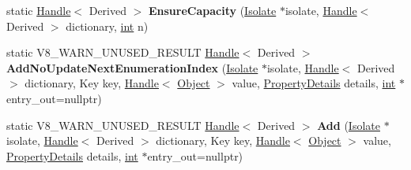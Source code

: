 \begin{DoxyCompactItemize}
\item 
\mbox{\label{classv8_1_1internal_1_1BaseNameDictionary_aee93748509f1c90c4a878e96349450c7}} 
static \mbox{\hyperlink{classv8_1_1internal_1_1Handle}{Handle}}$<$ Derived $>$ {\bfseries Ensure\+Capacity} (\mbox{\hyperlink{classv8_1_1internal_1_1Isolate}{Isolate}} $\ast$isolate, \mbox{\hyperlink{classv8_1_1internal_1_1Handle}{Handle}}$<$ Derived $>$ dictionary, \mbox{\hyperlink{classint}{int}} n)
\item 
\mbox{\label{classv8_1_1internal_1_1BaseNameDictionary_a5d882d40fc9e686f4410d516b70a0546}} 
static V8\+\_\+\+W\+A\+R\+N\+\_\+\+U\+N\+U\+S\+E\+D\+\_\+\+R\+E\+S\+U\+LT \mbox{\hyperlink{classv8_1_1internal_1_1Handle}{Handle}}$<$ Derived $>$ {\bfseries Add\+No\+Update\+Next\+Enumeration\+Index} (\mbox{\hyperlink{classv8_1_1internal_1_1Isolate}{Isolate}} $\ast$isolate, \mbox{\hyperlink{classv8_1_1internal_1_1Handle}{Handle}}$<$ Derived $>$ dictionary, Key key, \mbox{\hyperlink{classv8_1_1internal_1_1Handle}{Handle}}$<$ \mbox{\hyperlink{classv8_1_1internal_1_1Object}{Object}} $>$ value, \mbox{\hyperlink{classv8_1_1internal_1_1PropertyDetails}{Property\+Details}} details, \mbox{\hyperlink{classint}{int}} $\ast$entry\+\_\+out=nullptr)
\item 
\mbox{\label{classv8_1_1internal_1_1BaseNameDictionary_a9976eb760d1fe21d07f6e772aca1c3bf}} 
static V8\+\_\+\+W\+A\+R\+N\+\_\+\+U\+N\+U\+S\+E\+D\+\_\+\+R\+E\+S\+U\+LT \mbox{\hyperlink{classv8_1_1internal_1_1Handle}{Handle}}$<$ Derived $>$ {\bfseries Add} (\mbox{\hyperlink{classv8_1_1internal_1_1Isolate}{Isolate}} $\ast$isolate, \mbox{\hyperlink{classv8_1_1internal_1_1Handle}{Handle}}$<$ Derived $>$ dictionary, Key key, \mbox{\hyperlink{classv8_1_1internal_1_1Handle}{Handle}}$<$ \mbox{\hyperlink{classv8_1_1internal_1_1Object}{Object}} $>$ value, \mbox{\hyperlink{classv8_1_1internal_1_1PropertyDetails}{Property\+Details}} details, \mbox{\hyperlink{classint}{int}} $\ast$entry\+\_\+out=nullptr)
\end{DoxyCompactItemize}
